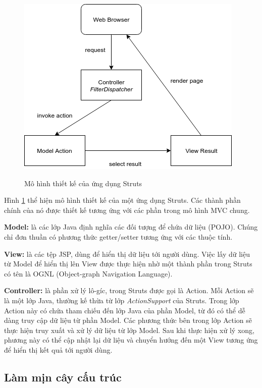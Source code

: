 \documentclass[12pt]{report}
\begin{document}
\begin{figure}[h]
	\centering
	\includegraphics[scale=0.8]{struts-architecture}
	\label{fig:struts-architecture}
	\caption{Mô hình thiết kế của ứng dụng Struts}
\end{figure}

Hình \ref{fig:struts-architecture} thể hiện mô hình thiết kế của một ứng dụng Struts. Các thành phần chính của nó được thiết kế tương ứng với các phần trong mô hình MVC chung.

\textbf{Model:} là các lớp Java định nghĩa các đối tượng để chứa dữ liệu (POJO). Chúng chỉ đơn thuần có phương thức getter/setter tương ứng với các thuộc tính.

\textbf{View:} là các tệp JSP, dùng để hiển thị dữ liệu tới người dùng. Việc lấy dữ liệu từ Model để hiển thị lên View được thực hiện nhờ một thành phần trong Struts có tên là OGNL (Object-graph Navigation Language).

\textbf{Controller:} là phần xử lý lô-gíc, trong Struts được gọi là Action. Mỗi Action sẽ là một lớp Java, thường kế thừa từ lớp \textit{ActionSupport} của Struts. Trong lớp Action này có chứa tham chiếu đến lớp Java của phần Model, từ đó có thể dễ dàng truy cập dữ liệu từ phần Model. Các phương thức bên trong lớp Action sẽ thực hiện truy xuất và xử lý dữ liệu từ lớp Model. Sau khi thực hiện xử lý xong, phương này có thể cập nhật lại dữ liệu và chuyển hướng đến một View tương ứng để hiển thị kết quả tới người dùng.

\subsection{Làm mịn cây cấu trúc}
\end{document}

